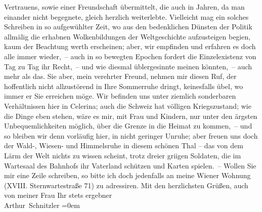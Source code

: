 \begin{ledgroupsized}[t]{13cm}
                    Vertrauens, sowie einer Freundschaft übermittelt, die auch in  Jahren, da man einander nicht begegnete,
                    gleich herzlich weiterlebte.\pend
           \pstart
           Vielleicht mag ein solches Schreiben in so aufgewühlter Zeit, wo aus den
                    bedenklichen Dünsten der Politik allmälig die erhabnen Wolkenbildun{\pb}gen der Weltgeschichte aufzusteigen begi{\geminationn}en, kaum der Beachtung werth erscheinen; aber,
                    wir empfinden und erfahren es doch alle immer wieder, – auch in so bewegten
                    Epochen fordert die Einzelexistenz von Tag zu Tag ihr Recht, – und wie diesmal
                    üblergesinnte meinen könnten, – auch mehr als das. Sie aber, mein verehrter
                    Freund, nehmen mir diesen Ruf, der hoffentlich nicht allzustörend in Ihre
                    Sommerruhe dringt, keinesfalls übel, wo immer er Sie erreichen möge.\pend
           \pstart
           Wir befinden uns unter ziemlich sonderbaren Verhältnissen hier in Celerina; auch die Schweiz hat völligen Kriegszustand; wie die Dinge eben
                    stehen, wäre es mir, mit Frau und Kindern, nur unter den ärgsten {\pb}Unbequemlichkeiten möglich, über die Grenze in die Heimat zu kommen, – und so
                    bleiben wir denn vorläufig \introOben{}hier\introOben{}, in nicht geringer
                    Unruhe; aber freuen uns doch der Wald-, Wiesen- und Himmelsruhe in diesem
                    schönen Thal – das von dem Lärm der Welt nichts zu wissen scheint, trotz dreier
                        gri{\geminationm}igen Soldaten, die im Wartesaal des
                    Bahnhofs ihr Vaterland schützen und Karten spielen. –\pend
           \pstart
           Wollen Sie mir eine Zeile schreiben, so bitte ich doch jedenfalls an meine Wiener Wohnung (XVIII. Sternwartestraße 71) zu adressiren.\pend
           \pstart
           Mit den herzlichsten Grüßen, auch von meiner Frau\pend
           \pstart
           Ihr stets ergebner{\\[\baselineskip]}\spacefill\mbox{Arthur Schnitzler}\pend
           \leftskip=0em{}\endnumbering{}\end{ledgroupsized}  \newcommand{\dateiname}{L02190}\newcommand{\titel}{Arthur Schnitzler an Georg Brandes, 3. 8. 1914}\newcommand{\editorInnen}{Martin Anton Müller und Gerd-Hermann Susen}
      